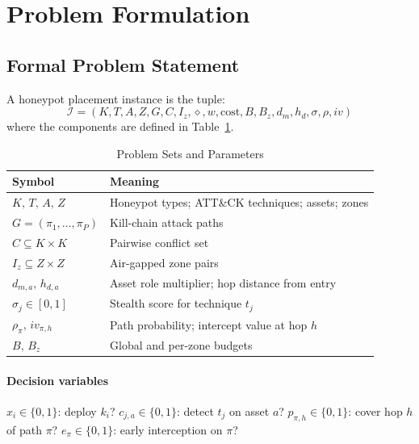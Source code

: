 \documentclass[journal]{IEEEtran}
\begin{document}
\section{Problem Formulation}
\label{sec:problem}

\subsection{Formal Problem Statement}

A honeypot placement instance is the tuple:
\begin{equation}
  \mathcal{I} = (K,T,A,Z,G,C,I_z,\diamond,w,\mathrm{cost},B,B_z,
                 d_m,h_d,\sigma,\rho,iv)
  \label{eq:instance}
\end{equation}
where the components are defined in Table~\ref{tab:symbols}.

\begin{table}[t]
\caption{Problem Sets and Parameters}
\label{tab:symbols}
\centering
\renewcommand{\arraystretch}{1.2}
\begin{tabular}{ll}
\toprule
Symbol & Meaning \\
\midrule
$K,\,T,\,A,\,Z$ & Honeypot types; ATT\&CK techniques; assets; zones \\
$G=(\pi_1,\dots,\pi_P)$ & Kill-chain attack paths \\
$C\subseteq K\times K$ & Pairwise conflict set \\
$I_z\subseteq Z\times Z$ & Air-gapped zone pairs \\
$d_{m,a},\,h_{d,a}$ & Asset role multiplier; hop distance from entry \\
$\sigma_j\in[0,1]$ & Stealth score for technique $t_j$ \\
$\rho_\pi,\,iv_{\pi,h}$ & Path probability; intercept value at hop $h$ \\
$B,\,B_z$ & Global and per-zone budgets \\
\bottomrule
\end{tabular}
\end{table}

\paragraph{Decision variables}
$x_i\in\{0,1\}$: deploy $k_i$?
$c_{j,a}\in\{0,1\}$: detect $t_j$ on asset $a$?
$p_{\pi,h}\in\{0,1\}$: cover hop $h$ of path $\pi$?
$e_\pi\in\{0,1\}$: early interception on $\pi$?
\end{document}
